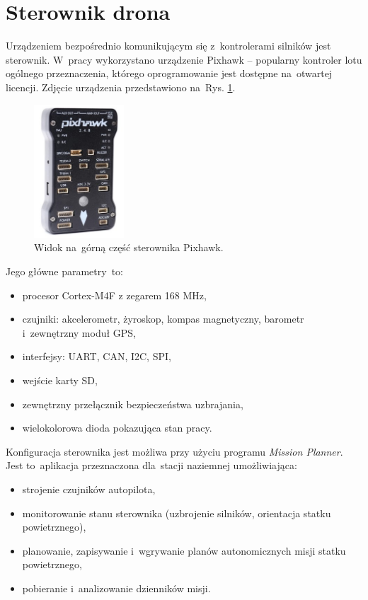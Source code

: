 \section{Sterownik drona}
\label{sec:autopilot}
Urządzeniem bezpośrednio komunikującym się z~kontrolerami silników jest sterownik. 
W~pracy wykorzystano urządzenie Pixhawk -- popularny kontroler lotu ogólnego przeznaczenia, którego oprogramowanie jest dostępne na~otwartej licencji. %
Zdjęcie urządzenia przedstawiono na~Rys. \ref{fig:zdjecie_pixhawk}.
\begin{figure}[h]
	\centering
	\includegraphics[width=0.3\textwidth]{zdjecie_pixhawk.jpg}
	\caption{Widok na~górną część sterownika Pixhawk.}
	\label{fig:zdjecie_pixhawk}
\end{figure}
Jego główne parametry~to:
\begin{itemize}
	\item procesor Cortex-M4F z zegarem 168 MHz,
	\item czujniki: akcelerometr, żyroskop, kompas magnetyczny, barometr i~zewnętrzny moduł GPS,
	\item interfejsy: UART, CAN, I2C, SPI,
	\item wejście karty SD,
	\item zewnętrzny przełącznik bezpieczeństwa uzbrajania,
	\item wielokolorowa dioda pokazująca stan pracy.
\end{itemize}
Konfiguracja sterownika jest możliwa przy użyciu programu \textit{Mission Planner}. 
Jest to~aplikacja przeznaczona dla~stacji naziemnej umożliwiająca:
\begin{itemize}
	\item strojenie czujników autopilota,
	\item monitorowanie stanu sterownika (uzbrojenie silników, orientacja statku powietrznego),
	\item planowanie, zapisywanie i~wgrywanie planów autonomicznych misji statku powietrznego,
	\item pobieranie i~analizowanie dzienników misji.
\end{itemize} 

